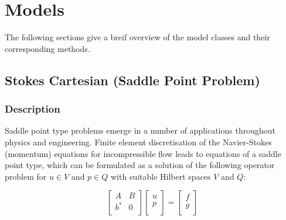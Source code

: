 %
%
%
%
%
%

\chapter{Models}

The following sections give a breif overview of the model classes and their corresponding methods.

\section{Stokes Cartesian (Saddle Point Problem)}

\subsection{Description}

Saddle point type problems emerge in a number of applications throughout physics and engineering. Finite element discretisation of the Navier-Stokes (momentum) equations for incompressible flow leads to equations of a saddle point type, which can be formulated as a solution of the following operator problem for $u \in V$ and $p \in Q$ with suitable Hilbert spaces $V$ and $Q$:

\begin{equation}
\left[ \begin{array}{cc}
A     & B \\
b^{*} & 0 \\
\end{array} \right]
\left[ \begin{array}{c}
u \\
p \\
\end{array} \right]
=\left[ \begin{array}{c}
f \\
g \\
\end{array} \right]
\label{SADDLEPOINT}
\end{equation}

